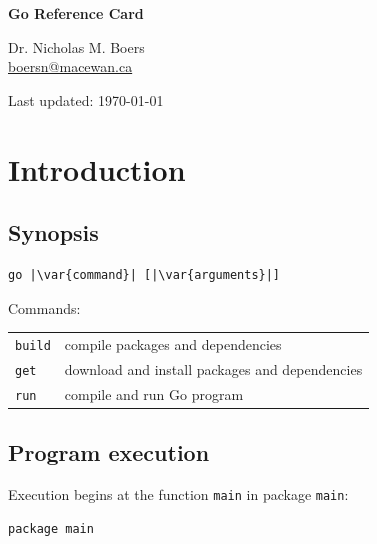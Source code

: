 \documentclass{article}
\newcommand{\var}[1]{\texttt{\textit{\underbar{#1}}}}
\begin{document}
\raggedright

\begin{multicols*}{3}
  \footnotesize

  \begin{center}
    {\Large{}\bfseries{}Go Reference Card}

    Dr. Nicholas M. Boers\\
    \url{boersn@macewan.ca}\\

    \vspace{1em}
    Last updated: \today
  \end{center}

  \filbreak
  \section*{Introduction}

  \subsection*{Synopsis}

\begin{lstlisting}[language=plain,escapechar=|]
go |\var{command}| [|\var{arguments}|]
\end{lstlisting}

  Commands:

  \begin{tabular}{p{0.5in}p{2.5in}}
    \texttt{build} & compile packages and dependencies \\
    \texttt{get} & download and install packages and dependencies \\
    \texttt{run} & compile and run Go program \\
  \end{tabular}

  \subsection*{Program execution}

  Execution begins at the function \lstinline{main} in package \lstinline{main}:
\begin{lstlisting}[frame=single,escapechar=\%]
package main


\end{lstlisting}
\end{multicols*}
\end{document}
